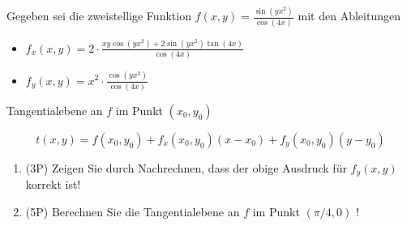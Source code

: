 Gegeben sei die zweistellige Funktion $f(x,y) = \frac{\sin(yx^2)}{\cos(4x)}$ mit den Ableitungen

\begin{itemize}
	\item $f_x(x,y) = 2 \cdot \frac{xy\cos(yx^2)+2\sin(yx^2)\tan(4x)}{\cos(4x)}$
	\item $f_y(x,y) = x^2 \cdot \frac{\cos(yx^2)}{\cos(4x)}$
\end{itemize}

Tangentialebene an $f$ im Punkt $(x_0,y_0)$

$$
t(x,y) = f(x_0,y_0) + f_x(x_0, y_0)(x-x_0) + f_y(x_0, y_0)(y-y_0)
$$

\begin{enumerate}[label=(\alph*)]

	\item (3P) Zeigen Sie durch Nachrechnen, dass der obige Ausdruck für $f_y(x,y)$ korrekt ist!
		\bigskip
		\bigskip
		\bigskip
		\bigskip
		\bigskip
		\bigskip
		\bigskip
		\bigskip
		
	\item (5P) Berechnen Sie die Tangentialebene an $f$ im Punkt $(\pi/4,0)$ !

\end{enumerate}
